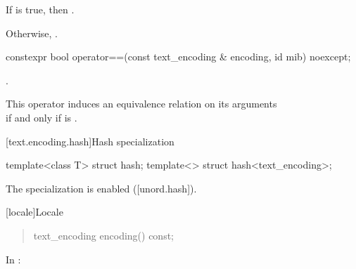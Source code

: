 \documentclass{wg21}
\begin{document}
\begin{addedblock}
\begin{itemdescr}
    \returns

    If  is true, then .

    Otherwise, .

\end{itemdescr}

\begin{itemdecl}
    constexpr bool operator==(const text_encoding & encoding, id mib) noexcept;
\end{itemdecl}

\begin{itemdescr}
    \returns {}.

    \remarks This operator induces an equivalence relation on its arguments\\
    if and only if  is .
\end{itemdescr}

[text.encoding.hash]{Hash specialization}

\begin{itemdecl}
template<class T> struct hash;
template<> struct hash<text_encoding>;
\end{itemdecl}

\begin{itemdescr}
The specialization is enabled ([unord.hash]).
\end{itemdescr}

\end{addedblock}


[locale]{Locale}

\begin{quote}
\begin{codeblock}
namespace std {
  class locale {
  public:
    [...]

    // locale operations
    string name() const;
\end{codeblock}
\begin{addedblock}
\begin{codeblock}
    text_encoding encoding() const;
\end{codeblock}
\end{addedblock}
\begin{codeblock}
  };
}
\end{codeblock}
\end{quote}

In :
\end{document}
